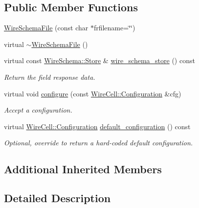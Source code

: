 \subsection*{Public Member Functions}
\begin{DoxyCompactItemize}
\item 
\hyperlink{class_wire_cell_1_1_gen_1_1_wire_schema_file_acceab8ef814be6103411f4d498b3a017}{Wire\+Schema\+File} (const char $\ast$frfilename=\char`\"{}\char`\"{})
\item 
virtual \hyperlink{class_wire_cell_1_1_gen_1_1_wire_schema_file_afc01a03ebf180540acc69ec3315a3dd4}{$\sim$\+Wire\+Schema\+File} ()
\item 
virtual const \hyperlink{class_wire_cell_1_1_wire_schema_1_1_store}{Wire\+Schema\+::\+Store} \& \hyperlink{class_wire_cell_1_1_gen_1_1_wire_schema_file_a127d3bf1f678722d248cce569141a69e}{wire\+\_\+schema\+\_\+store} () const
\begin{DoxyCompactList}\small\item\em Return the field response data. \end{DoxyCompactList}\item 
virtual void \hyperlink{class_wire_cell_1_1_gen_1_1_wire_schema_file_a790d78e917e9fb5b2b19406e4b054c03}{configure} (const \hyperlink{namespace_wire_cell_a9f705541fc1d46c608b3d32c182333ee}{Wire\+Cell\+::\+Configuration} \&cfg)
\begin{DoxyCompactList}\small\item\em Accept a configuration. \end{DoxyCompactList}\item 
virtual \hyperlink{namespace_wire_cell_a9f705541fc1d46c608b3d32c182333ee}{Wire\+Cell\+::\+Configuration} \hyperlink{class_wire_cell_1_1_gen_1_1_wire_schema_file_a5ab602615a1b5ff472535c65f1f0fb9a}{default\+\_\+configuration} () const
\begin{DoxyCompactList}\small\item\em Optional, override to return a hard-\/coded default configuration. \end{DoxyCompactList}\end{DoxyCompactItemize}
\subsection*{Additional Inherited Members}


\subsection{Detailed Description}


